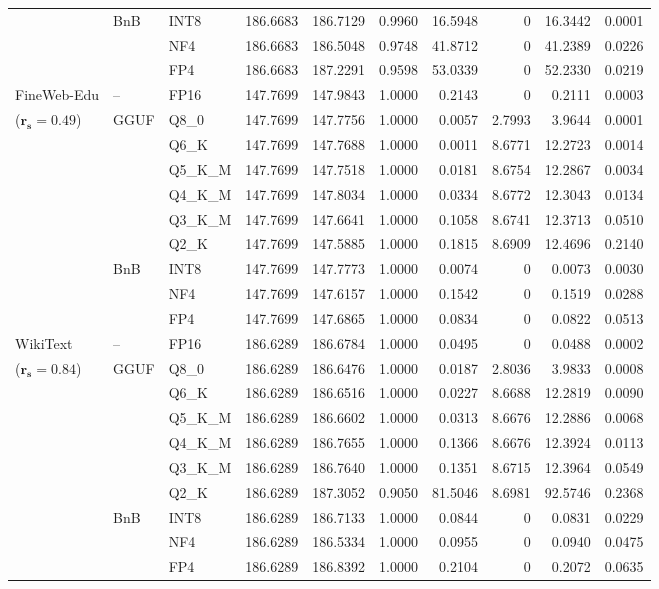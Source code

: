\begin{longtable}{ll l rrrrrrr}
 & BnB & INT8 & 186.6683 & 186.7129 & 0.9960 & 16.5948 & \cellcolor{cyan!12} $0$ & 16.3442 & 0.0001 \\
 &  & NF4 & 186.6683 & 186.5048 & 0.9748 & 41.8712 & \cellcolor{cyan!12} $0$ & 41.2389 & 0.0226 \\
 &  & FP4 & 186.6683 & 187.2291 & 0.9598 & 53.0339 & \cellcolor{cyan!12} $0$ & 52.2330 & 0.0219 \\
\midrule
FineWeb-Edu & -- & FP16 & 147.7699 & 147.9843 & 1.0000 & 0.2143 & \cellcolor{cyan!12} $0$ & 0.2111 & 0.0003 \\
{\small ($\mathbf{r_s{=}0.49}$)} & GGUF & Q8\_0 & 147.7699 & 147.7756 & 1.0000 & 0.0057 & 2.7993 & 3.9644 & 0.0001 \\
 &  & Q6\_K & 147.7699 & 147.7688 & 1.0000 & 0.0011 & 8.6771 & 12.2723 & 0.0014 \\
 &  & Q5\_K\_M & 147.7699 & 147.7518 & 1.0000 & 0.0181 & 8.6754 & 12.2867 & 0.0034 \\
 &  & Q4\_K\_M & 147.7699 & 147.8034 & 1.0000 & 0.0334 & 8.6772 & 12.3043 & 0.0134 \\
 &  & Q3\_K\_M & 147.7699 & 147.6641 & 1.0000 & 0.1058 & 8.6741 & 12.3713 & 0.0510 \\
 &  & Q2\_K & 147.7699 & 147.5885 & 1.0000 & 0.1815 & 8.6909 & 12.4696 & 0.2140 \\
 & BnB & INT8 & 147.7699 & 147.7773 & 1.0000 & 0.0074 & \cellcolor{cyan!12} $0$ & 0.0073 & 0.0030 \\
 &  & NF4 & 147.7699 & 147.6157 & 1.0000 & 0.1542 & \cellcolor{cyan!12} $0$ & 0.1519 & 0.0288 \\
 &  & FP4 & 147.7699 & 147.6865 & 1.0000 & 0.0834 & \cellcolor{cyan!12} $0$ & 0.0822 & 0.0513 \\
\midrule
WikiText & -- & FP16 & 186.6289 & 186.6784 & 1.0000 & 0.0495 & \cellcolor{cyan!12} $0$ & 0.0488 & 0.0002 \\
{\small ($\mathbf{r_s{=}0.84}$)} & GGUF & Q8\_0 & 186.6289 & 186.6476 & 1.0000 & 0.0187 & 2.8036 & 3.9833 & 0.0008 \\
 &  & Q6\_K & 186.6289 & 186.6516 & 1.0000 & 0.0227 & 8.6688 & 12.2819 & 0.0090 \\
 &  & Q5\_K\_M & 186.6289 & 186.6602 & 1.0000 & 0.0313 & 8.6676 & 12.2886 & 0.0068 \\
 &  & Q4\_K\_M & 186.6289 & 186.7655 & 1.0000 & 0.1366 & 8.6676 & 12.3924 & 0.0113 \\
 &  & Q3\_K\_M & 186.6289 & 186.7640 & 1.0000 & 0.1351 & 8.6715 & 12.3964 & 0.0549 \\
 &  & Q2\_K & 186.6289 & 187.3052 & \cellcolor{red!18} 0.9050 & \cellcolor{red!18} 81.5046 & 8.6981 & \cellcolor{red!18} 92.5746 & \cellcolor{red!18} 0.2368 \\
 & BnB & INT8 & 186.6289 & 186.7133 & 1.0000 & 0.0844 & \cellcolor{cyan!12} $0$ & 0.0831 & 0.0229 \\
 &  & NF4 & 186.6289 & 186.5334 & 1.0000 & 0.0955 & \cellcolor{cyan!12} $0$ & 0.0940 & 0.0475 \\
 &  & FP4 & 186.6289 & 186.8392 & 1.0000 & 0.2104 & \cellcolor{cyan!12} $0$ & 0.2072 & 0.0635 \\
\end{longtable}
\endgroup